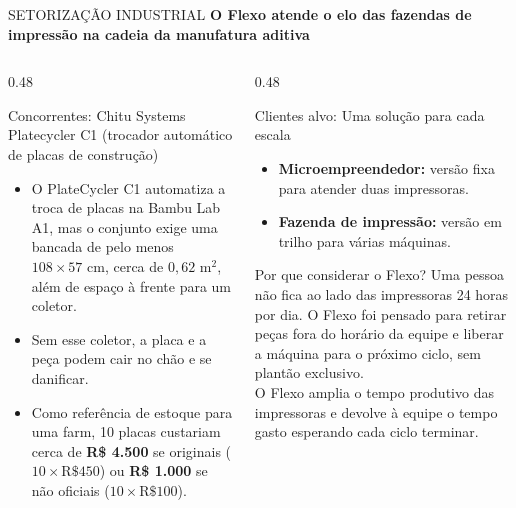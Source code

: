 \documentclass[aspectratio=169, 10pt]{beamer}
\newcommand{\currentpresenter}{Rodrigo}
\newcommand{\setpresenter}[1]{\renewcommand{\currentpresenter}{#1}}
\begin{document}
	\setpresenter{Steve}
	\begin{frame}{SETORIZAÇÃO INDUSTRIAL}
		\textbf{\normalsize O Flexo atende o elo das fazendas de impressão na cadeia da manufatura aditiva}
		\vspace{0.2cm}
		
		\begin{columns}[T]
			\begin{column}{0.48\textwidth}
				\begin{block}{Concorrentes: Chitu Systems Platecycler C1}
					\scriptsize
					(trocador automático de placas de construção)
					\vspace{0.1cm}
					\begin{itemize}
						\item O PlateCycler C1 automatiza a troca de placas na Bambu Lab A1, mas o conjunto exige uma bancada de pelo menos $108 \times 57\text{ cm}$, cerca de $0,62\text{ m}^{2}$, além de espaço à frente para um coletor.
						\item Sem esse coletor, a placa e a peça podem cair no chão e se danificar.
						\item Como referência de estoque para uma farm, 10 placas custariam cerca de \textbf{R\$ 4.500} se originais ($10 \times \text{R\$ }450$) ou \textbf{R\$ 1.000} se não oficiais ($10 \times \text{R\$ }100$).
					\end{itemize}
				\end{block}
			\end{column}
			
			\begin{column}{0.48\textwidth}
				\begin{block}{Clientes alvo: Uma solução para cada escala}
					\scriptsize
					\begin{itemize}
						\item \textbf{Microempreendedor:} versão fixa para atender duas impressoras.
						\item \textbf{Fazenda de impressão:} versão em trilho para várias máquinas.
					\end{itemize}
				\end{block}
				
				\vspace{0.15cm}
				\begin{alertblock}{Por que considerar o Flexo?}
					\scriptsize
					Uma pessoa não fica ao lado das impressoras 24 horas por dia. O Flexo foi pensado para retirar peças fora do horário da equipe e liberar a máquina para o próximo ciclo, sem plantão exclusivo.\\[4pt]
					O Flexo amplia o tempo produtivo das impressoras e devolve à equipe o tempo gasto esperando cada ciclo terminar.
				\end{alertblock}
			\end{column}
		\end{columns}
	\end{frame}
	
\end{document}
